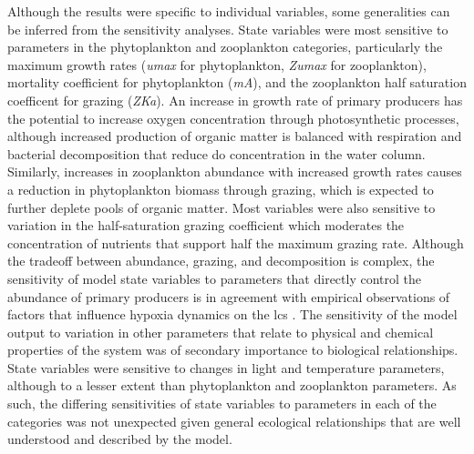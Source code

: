 \documentclass[letterpaper,12pt,oneside]{article}\usepackage[]{graphicx}\usepackage[]{color}
\begin{document}
Although the results were specific to individual variables, some generalities can be inferred from the sensitivity analyses. State variables were most sensitive to parameters in the phytoplankton and zooplankton categories, particularly the maximum growth rates (\textit{umax} for phytoplankton, \textit{Zumax} for zooplankton), mortality coefficient for phytoplankton (\textit{mA}), and the zooplankton half saturation coefficent for grazing (\textit{ZKa}). An increase in growth rate of primary producers has the potential to increase oxygen concentration through photosynthetic processes, although increased production of organic matter is balanced with respiration and bacterial decomposition that reduce \ac{do} concentration in the water column.  Similarly, increases in zooplankton abundance with increased growth rates causes a reduction in phytoplankton biomass through grazing, which is expected to further deplete pools of organic matter.  Most variables were also sensitive to variation in the half-saturation grazing coefficient which moderates the concentration of nutrients that support half the maximum grazing rate. Although the tradeoff between abundance, grazing, and decomposition is complex, the sensitivity of model state variables to parameters that directly control the abundance of primary producers is in agreement with empirical observations of factors that influence hypoxia dynamics on the \ac{lcs} \citep{Fahnenstiel95,Roelke00,Eldridge10}. The sensitivity of the model output to variation in other parameters that relate to physical and chemical properties of the system was of secondary importance to biological relationships.  State variables were sensitive to changes in light and temperature parameters, although to a lesser extent than phytoplankton and zooplankton parameters.  As such, the differing sensitivities of state variables to parameters in each of the categories was not unexpected given general ecological relationships that are well understood and described by the model.    
\end{document}
